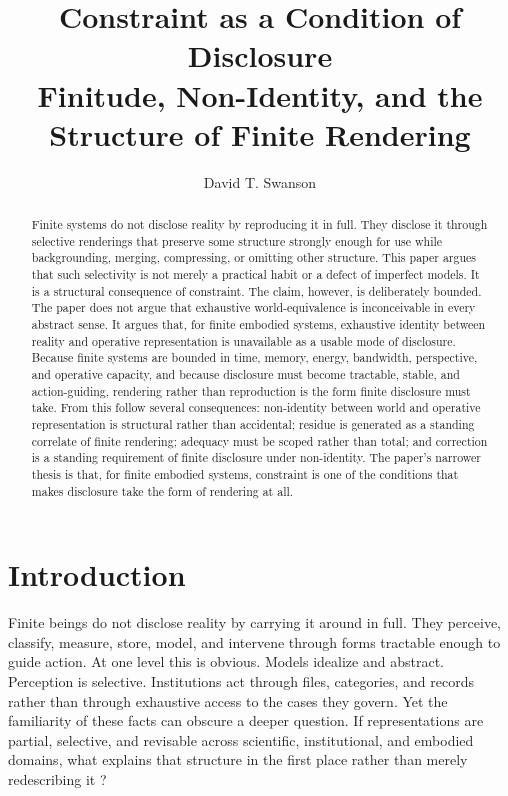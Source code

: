 \documentclass[11pt]{article}
\title{\textbf{Constraint as a Condition of Disclosure}\\
\large Finitude, Non-Identity, and the Structure of Finite Rendering}
\author{David T. Swanson}
\date{}
\begin{document}
\maketitle

\begin{abstract}
Finite systems do not disclose reality by reproducing it in full. They disclose it through selective renderings that preserve some structure strongly enough for use while backgrounding, merging, compressing, or omitting other structure. This paper argues that such selectivity is not merely a practical habit or a defect of imperfect models. It is a structural consequence of constraint. The claim, however, is deliberately bounded. The paper does not argue that exhaustive world-equivalence is inconceivable in every abstract sense. It argues that, for finite embodied systems, exhaustive identity between reality and operative representation is unavailable as a usable mode of disclosure. Because finite systems are bounded in time, memory, energy, bandwidth, perspective, and operative capacity, and because disclosure must become tractable, stable, and action-guiding, rendering rather than reproduction is the form finite disclosure must take. From this follow several consequences: non-identity between world and operative representation is structural rather than accidental; residue is generated as a standing correlate of finite rendering; adequacy must be scoped rather than total; and correction is a standing requirement of finite disclosure under non-identity. The paper's narrower thesis is that, for finite embodied systems, constraint is one of the conditions that makes disclosure take the form of rendering at all.
\end{abstract}

\section{Introduction}

Finite beings do not disclose reality by carrying it around in full. They perceive, classify, measure, store, model, and intervene through forms tractable enough to guide action. At one level this is obvious. Models idealize and abstract. Perception is selective. Institutions act through files, categories, and records rather than through exhaustive access to the cases they govern. Yet the familiarity of these facts can obscure a deeper question. If representations are partial, selective, and revisable across scientific, institutional, and embodied domains, what explains that structure in the first place rather than merely redescribing it \cite{FriggNguyen2021ScientificRepresentationSEP,FriggHartmann2025ModelsScienceSEP,Wheeler2024BoundedRationalitySEP}?
\end{document}
